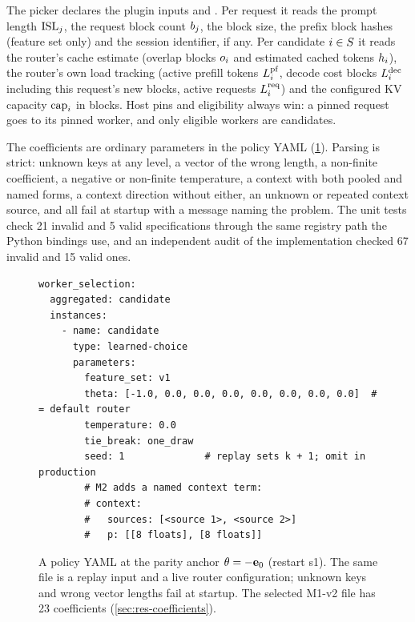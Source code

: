 The picker declares the plugin inputs  and . Per request it reads the
prompt length $\mathrm{ISL}_j$, the request block count $b_j$, the block size, the prefix block
hashes (feature set  only) and the session identifier, if any. Per candidate
$i \in S$ it reads the router's cache estimate (overlap blocks $o_i$ and estimated cached
tokens $h_i$), the router's own load tracking (active prefill tokens $L^{\mathrm{pf}}_i$, decode cost
blocks $L^{\mathrm{dec}}_i$ including this request's new blocks, active requests $L^{\mathrm{req}}_i$) and the
configured KV capacity $\mathrm{cap}_i$ in blocks. Host pins and eligibility always win: a pinned request
goes to its pinned worker, and only eligible workers are candidates.

The coefficients are ordinary parameters in the policy YAML (\cref{fig:yaml}). Parsing is
strict: unknown keys at any level, a vector of the wrong length, a non-finite coefficient, a
negative or non-finite temperature, a context with both pooled and named forms, a context
direction without either, an unknown or repeated context source, and  all
fail at startup with a message naming the problem. The unit tests check 21 invalid and 5 valid
specifications through the same registry path the Python bindings use, and an independent audit
of the implementation checked 67 invalid and 15 valid ones.

\begin{figure}[tbp]
\small
\begin{verbatim}
worker_selection:
  aggregated: candidate
  instances:
    - name: candidate
      type: learned-choice
      parameters:
        feature_set: v1
        theta: [-1.0, 0.0, 0.0, 0.0, 0.0, 0.0, 0.0, 0.0]  # = default router
        temperature: 0.0
        tie_break: one_draw
        seed: 1              # replay sets k + 1; omit in production
        # M2 adds a named context term:
        # context:
        #   sources: [<source 1>, <source 2>]
        #   p: [[8 floats], [8 floats]]
\end{verbatim}
\caption{A \lc{} policy YAML at the parity anchor $\theta = -\mathbf{e}_{0}$ (restart s1). The same
  file is a replay input and a live router configuration; unknown keys and wrong vector lengths
  fail at startup. The selected M1-v2 file has 23 coefficients (\cref{sec:res-coefficients}).}
\label{fig:yaml}
\end{figure}

